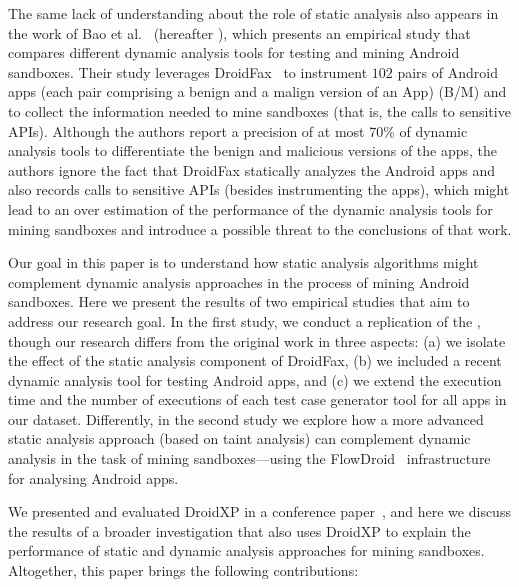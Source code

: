 The same lack of understanding about the role of static analysis also appears in the work of Bao et al.~\cite{DBLP:conf/wcre/BaoLL18} (hereafter \blls), which presents an empirical study that compares different dynamic analysis tools for testing and mining Android sandboxes. Their study leverages DroidFax~\cite{DBLP:conf/icsm/CaiR17a} to instrument $102$ pairs of Android apps (each pair comprising a benign and a malign version of an App) (B/M) and to collect the information needed to mine sandboxes (that is, the calls to sensitive APIs).
Although the authors report a precision of at most 70\% of dynamic analysis tools to differentiate the benign and malicious versions of the apps, the authors ignore the fact that DroidFax statically analyzes the Android apps and also records calls to sensitive APIs (besides instrumenting the apps), which might lead to an over estimation of the performance of the dynamic analysis tools for mining sandboxes and introduce a possible threat to the conclusions of that work.

Our goal in this paper is to understand how static analysis
algorithms might complement dynamic analysis approaches in the process of mining Android sandboxes. Here we
present the results of two empirical studies that aim to
address our research goal. In the
first study, we conduct a replication of the \blls, though our research differs from the original work in three aspects: (a)
we isolate the effect of the static analysis component of DroidFax, (b) we included a recent dynamic analysis tool for testing Android apps,
and (c) we extend the execution time and the number of executions of each test case generator tool for all apps
in our dataset. Differently, in the second study we explore how a more advanced static analysis approach
(based on taint analysis) can complement dynamic analysis in the task of mining sandboxes---using
the FlowDroid~\cite{DBLP:conf/pldi/ArztRFBBKTOM14} infrastructure for analysing Android apps.

We presented and evaluated DroidXP in a conference paper~\cite{DBLP:conf/scam/CostaMCMVBC20},
and here we discuss the results of a broader investigation
that also uses DroidXP to explain the performance of static and dynamic analysis
approaches for mining sandboxes. Altogether, this paper brings the following contributions:

